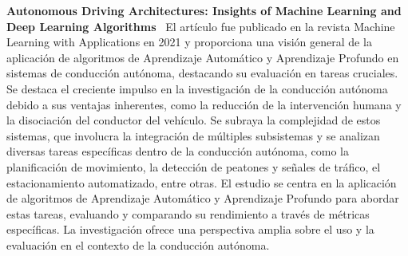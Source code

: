 \textbf{Autonomous Driving Architectures: Insights of Machine Learning and Deep Learning Algorithms}~\cite{bachute2021autonomous}
El artículo fue publicado en la revista Machine Learning with Applications en 2021 y
proporciona una visión general de la aplicación de algoritmos de Aprendizaje Automático y Aprendizaje Profundo
en sistemas de conducción autónoma, destacando su evaluación en tareas cruciales.
Se destaca el creciente impulso en la investigación de la conducción autónoma debido a sus ventajas inherentes, como la reducción
de la intervención humana y la disociación del conductor del vehículo.
Se subraya la complejidad de estos sistemas,
que involucra la integración de múltiples subsistemas y se analizan diversas tareas específicas dentro de la conducción autónoma,
como la planificación de movimiento, la detección de peatones y señales de tráfico, el estacionamiento automatizado, entre otras.
El estudio se centra en la aplicación de algoritmos de Aprendizaje Automático y Aprendizaje Profundo para abordar estas tareas,
evaluando y comparando su rendimiento a través de métricas específicas. La investigación ofrece una perspectiva amplia sobre el uso
y la evaluación en el contexto de la conducción autónoma.
